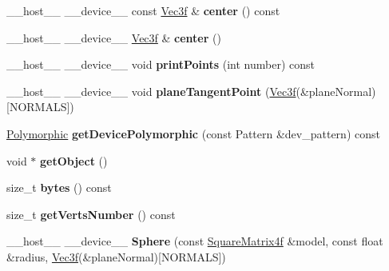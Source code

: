 \begin{DoxyCompactItemize}
\item 
\+\_\+\+\_\+host\+\_\+\+\_\+ \+\_\+\+\_\+device\+\_\+\+\_\+ const \hyperlink{class_vec3}{Vec3f} \& {\bfseries center} () const\hypertarget{class_sphere_aa42da7338d536728abf563bc57fcb819}{}\label{class_sphere_aa42da7338d536728abf563bc57fcb819}

\item 
\+\_\+\+\_\+host\+\_\+\+\_\+ \+\_\+\+\_\+device\+\_\+\+\_\+ \hyperlink{class_vec3}{Vec3f} \& {\bfseries center} ()\hypertarget{class_sphere_a15a8c4847cea8d3a72ea91f9c71e8160}{}\label{class_sphere_a15a8c4847cea8d3a72ea91f9c71e8160}

\item 
\+\_\+\+\_\+host\+\_\+\+\_\+ \+\_\+\+\_\+device\+\_\+\+\_\+ void {\bfseries print\+Points} (int number) const\hypertarget{class_sphere_a80b41ffe0cbe37bc7a174e2e2c3cd12d}{}\label{class_sphere_a80b41ffe0cbe37bc7a174e2e2c3cd12d}

\item 
\+\_\+\+\_\+host\+\_\+\+\_\+ \+\_\+\+\_\+device\+\_\+\+\_\+ void {\bfseries plane\+Tangent\+Point} (\hyperlink{class_vec3}{Vec3f}(\&plane\+Normal)\mbox{[}N\+O\+R\+M\+A\+LS\mbox{]})\hypertarget{class_sphere_a95ce96c8e7b11551f13231ec084505d5}{}\label{class_sphere_a95ce96c8e7b11551f13231ec084505d5}

\item 
\hyperlink{struct_polymorphic}{Polymorphic} {\bfseries get\+Device\+Polymorphic} (const Pattern \&dev\+\_\+pattern) const\hypertarget{class_sphere_a3b912df967e257861160b74a11ae09ce}{}\label{class_sphere_a3b912df967e257861160b74a11ae09ce}

\item 
void $\ast$ {\bfseries get\+Object} ()\hypertarget{class_sphere_a4c1b3cc7e4ba295d44f9bf18e8b6ad89}{}\label{class_sphere_a4c1b3cc7e4ba295d44f9bf18e8b6ad89}

\item 
size\+\_\+t {\bfseries bytes} () const\hypertarget{class_sphere_a4653e693258cda646d795212b88d8104}{}\label{class_sphere_a4653e693258cda646d795212b88d8104}

\item 
size\+\_\+t {\bfseries get\+Verts\+Number} () const\hypertarget{class_sphere_a8381fa5f8257232a97614b155316b7eb}{}\label{class_sphere_a8381fa5f8257232a97614b155316b7eb}

\item 
\+\_\+\+\_\+host\+\_\+\+\_\+ \+\_\+\+\_\+device\+\_\+\+\_\+ {\bfseries Sphere} (const \hyperlink{class_square_matrix4}{Square\+Matrix4f} \&model, const float \&radius, \hyperlink{class_vec3}{Vec3f}(\&plane\+Normal)\mbox{[}N\+O\+R\+M\+A\+LS\mbox{]})\hypertarget{class_sphere_a6202639ed0ffaf44a7eaa55953eae1f9}{}\label{class_sphere_a6202639ed0ffaf44a7eaa55953eae1f9}


\end{DoxyCompactItemize}
